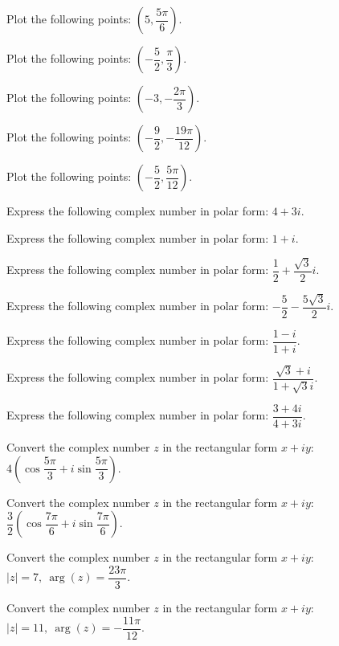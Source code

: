 \documentclass[11pt,a4paper]{article}
\begin{document}
\begin{shortlist}
\item Plot the following points: $\left(5,\dfrac{5\pi}{6}\right)$.

\item Plot the following points: $\left(-\dfrac{5}{2},\dfrac{\pi}{3}\right)$.

\item Plot the following points: $\left(-3,-\dfrac{2\pi}{3}\right)$.

\item Plot the following points: $\left(-\dfrac{9}{2},-\dfrac{19\pi}{12}\right)$.

\item Plot the following points: $\left(-\dfrac{5}{2},\dfrac{5\pi}{12}\right)$.

\item Express the following complex number in polar form: $4+3i$.

\item Express the following complex number in polar form: $1+i$.

\item Express the following complex number in polar form: $\dfrac{1}{2}+\dfrac{\sqrt{3}}{2}i$.

\item Express the following complex number in polar form: $-\dfrac{5}{2}-\dfrac{5\sqrt{3}}{2}i$.

\item Express the following complex number in polar form: $\dfrac{1-i}{1+i}$.

\item Express the following complex number in polar form: $\dfrac{\sqrt{3}+i}{1+\sqrt{3}i}$.

\item Express the following complex number in polar form: $\dfrac{3+4i}{4+3i}$.

\item Convert the complex number $z$ in the rectangular form $x+iy$: $4\left(\cos\dfrac{5\pi}{3}+i\sin\dfrac{5\pi}{3}\right)$.

\item Convert the complex number $z$ in the rectangular form $x+iy$: $\dfrac{3}{2}\left(\cos\dfrac{7\pi}{6}+i\sin\dfrac{7\pi}{6}\right)$.

\item Convert the complex number $z$ in the rectangular form $x+iy$: $|z|=7,\ \arg(z)=\dfrac{23\pi}{3}$.

\item Convert the complex number $z$ in the rectangular form $x+iy$: $|z|=11,\ \arg(z)=-\dfrac{11\pi}{12}$.


\end{shortlist}
\end{document}
